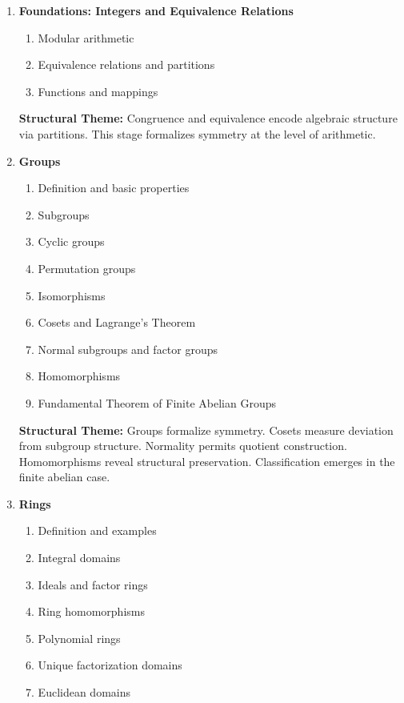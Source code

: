 \begin{enumerate}

\item \textbf{Foundations: Integers and Equivalence Relations}

\begin{enumerate}
    \item Modular arithmetic
    \item Equivalence relations and partitions
    \item Functions and mappings
\end{enumerate}

\vspace{0.5em}
\textbf{Structural Theme:}
Congruence and equivalence encode algebraic structure via partitions.
This stage formalizes symmetry at the level of arithmetic.


\item \textbf{Groups}

\begin{enumerate}
    \item Definition and basic properties
    \item Subgroups
    \item Cyclic groups
    \item Permutation groups
    \item Isomorphisms
    \item Cosets and Lagrange’s Theorem
    \item Normal subgroups and factor groups
    \item Homomorphisms
    \item Fundamental Theorem of Finite Abelian Groups
\end{enumerate}

\vspace{0.5em}
\textbf{Structural Theme:}
Groups formalize symmetry.
Cosets measure deviation from subgroup structure.
Normality permits quotient construction.
Homomorphisms reveal structural preservation.
Classification emerges in the finite abelian case.


\item \textbf{Rings}

\begin{enumerate}
    \item Definition and examples
    \item Integral domains
    \item Ideals and factor rings
    \item Ring homomorphisms
    \item Polynomial rings
    \item Unique factorization domains
    \item Euclidean domains
\end{enumerate}


\end{enumerate}

